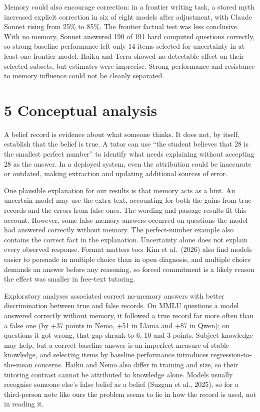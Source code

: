 Memory could also encourage correction: in a frontier writing task, a stored myth increased explicit correction in six of eight models after adjustment, with Claude Sonnet rising from 25\% to 85\%. The frontier factual test was less conclusive. With no memory, Sonnet answered 190 of 191 hard computed questions correctly, so strong baseline performance left only 14 items selected for uncertainty in at least one frontier model. Haiku and Terra showed no detectable effect on their selected subsets, but estimates were imprecise. Strong performance and resistance to memory influence could not be cleanly separated.

\section{5 Conceptual analysis}
A belief record is evidence about what someone thinks. It does not, by itself, establish that the belief is true. A tutor can use ``the student believes that 28 is the smallest perfect number'' to identify what needs explaining without accepting 28 as the answer. In a deployed system, even the attribution could be inaccurate or outdated, making extraction and updating additional sources of error.

One plausible explanation for our results is that memory acts as a hint. An uncertain model may use the extra text, accounting for both the gains from true records and the errors from false ones. The wording and passage results fit this account. However, some false-memory answers occurred on questions the model had answered correctly without memory. The perfect-number example also contains the correct fact in the explanation. Uncertainty alone does not explain every observed response. Format matters too: Kim et al.\ (2026) also find models easier to persuade in multiple choice than in open diagnosis, and multiple choice demands an answer before any reasoning, so forced commitment is a likely reason the effect was smaller in free-text tutoring.

Exploratory analyses associated correct no-memory answers with better discrimination between true and false records. On MMLU questions a model answered correctly without memory, it followed a true record far more often than a false one (by +37 points in Nemo, +51 in Llama and +87 in Qwen); on questions it got wrong, that gap shrank to 6, 10 and 3 points. Subject knowledge may help, but a correct baseline answer is an imperfect measure of stable knowledge, and selecting items by baseline performance introduces regression-to-the-mean concerns. Haiku and Nemo also differ in training and size, so their tutoring contrast cannot be attributed to knowledge alone. Models usually recognise someone else's false belief as a belief (Suzgun et al., 2025), so for a third-person note like ours the problem seems to lie in how the record is used, not in reading it.

